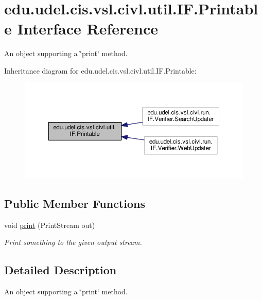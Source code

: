 \hypertarget{interfaceedu_1_1udel_1_1cis_1_1vsl_1_1civl_1_1util_1_1IF_1_1Printable}{}\section{edu.\+udel.\+cis.\+vsl.\+civl.\+util.\+I\+F.\+Printable Interface Reference}
\label{interfaceedu_1_1udel_1_1cis_1_1vsl_1_1civl_1_1util_1_1IF_1_1Printable}


An object supporting a \char`\"{}print\char`\"{} method.  




Inheritance diagram for edu.\+udel.\+cis.\+vsl.\+civl.\+util.\+I\+F.\+Printable\+:
\nopagebreak
\begin{figure}[H]
\begin{center}
\leavevmode
\includegraphics[width=350pt]{interfaceedu_1_1udel_1_1cis_1_1vsl_1_1civl_1_1util_1_1IF_1_1Printable__inherit__graph}
\end{center}
\end{figure}
\subsection*{Public Member Functions}
\begin{DoxyCompactItemize}
\item 
void \hyperlink{interfaceedu_1_1udel_1_1cis_1_1vsl_1_1civl_1_1util_1_1IF_1_1Printable_ab7cfeae0decfe0cf511367a897d27650}{print} (Print\+Stream out)
\begin{DoxyCompactList}\small\item\em Print something to the given output stream. \end{DoxyCompactList}\end{DoxyCompactItemize}


\subsection{Detailed Description}
An object supporting a \char`\"{}print\char`\"{} method. 

